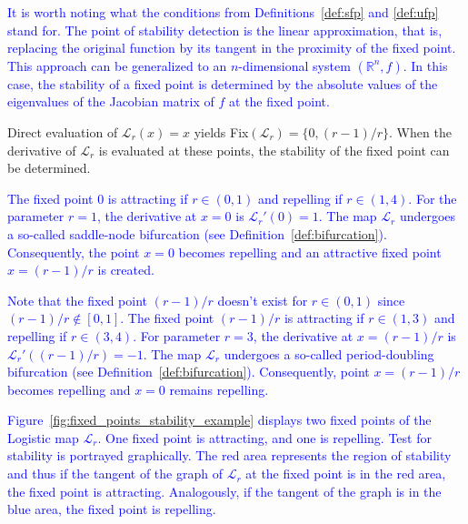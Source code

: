 \begin{remark}
    \textcolor{blue}{
        It is worth noting what the conditions from Definitions~\ref{def:sfp} and \ref{def:ufp} stand for.
        The point of stability detection is the linear approximation, that is, replacing the original function by its tangent in the proximity of the fixed point.
        This approach can be generalized to an $n$-dimensional system $\left( \mathbb{R}^{n}, f \right)$.
        In this case, the stability of a fixed point is determined by the absolute values of the eigenvalues of the Jacobian matrix of $f$ at the fixed point.
    }
    \par
    Direct evaluation of $\mathcal{L}_{r}(x)=x$ yields Fix$(\mathcal{L}_{r}) = \{ 0, (r-1)/r \}$.
    When the derivative of $\mathcal{L}_{r}$ is evaluated at these points, the stability of the fixed point can be determined.
    \par
    \textcolor{blue}{
    The fixed point $0$ is attracting if $r \in (0, 1)$ and repelling if $r \in (1, 4)$.
    For the parameter $r = 1$, the derivative at $x=0$ is $\mathcal{L}_{r}'(0)=1$.
    The map $\mathcal{L}_{r}$ undergoes a so-called saddle-node bifurcation (see Definition~\ref{def:bifurcation}).
    Consequently, the point $x=0$ becomes repelling and an attractive fixed point $x=(r-1)/r$ is created.
    }
    \par
    \textcolor{blue}{
    Note that the fixed point $(r-1)/r$ doesn't exist for $r \in (0, 1)$ since $(r-1)/r \notin [0, 1]$. 
    The fixed point $(r-1)/r$ is attracting if $r \in (1, 3)$ and repelling if $r \in (3, 4) $.
    For parameter $r = 3$, the derivative at $x=(r-1)/r$ is $\mathcal{L}_{r}'((r-1)/r)=-1$.
    The map $\mathcal{L}_{r}$ undergoes a so-called period-doubling bifurcation (see Definition~\ref{def:bifurcation}).
    Consequently, point $x=(r-1)/r$ becomes repelling and $x=0$ remains repelling.
    }
    \par
    \textcolor{blue}{
    Figure~\ref{fig:fixed_points_stability_example} displays two fixed points of the Logistic map $\mathcal{L}_{r}$.
    One fixed point is attracting, and one is repelling.
    Test for stability is portrayed graphically.
    The red area represents the region of stability and thus if the tangent of the graph of $\mathcal{L}_{r}$ at the fixed point is in the red area, the fixed point is attracting.
    Analogously, if the tangent of the graph is in the blue area, the fixed point is repelling.
    }
\end{remark}

